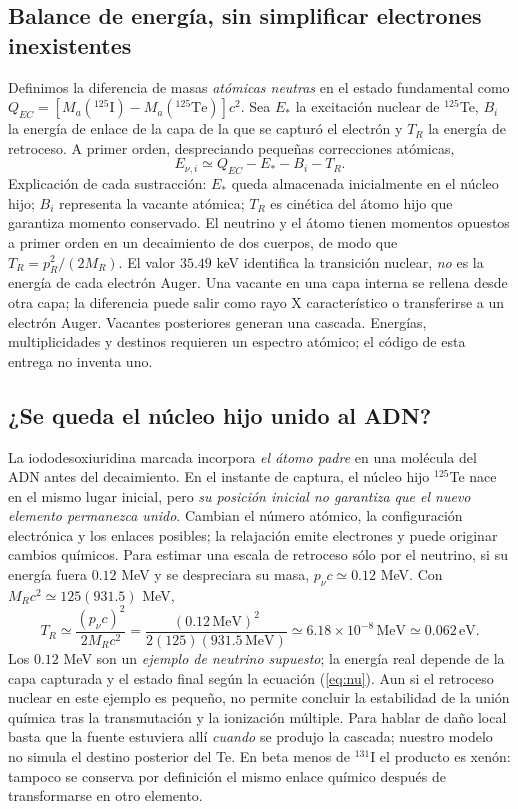 \documentclass[11pt,a4paper]{article}
\newcommand{\I}{\mathrm I}\newcommand{\Te}{\mathrm{Te}}\newcommand{\Xe}{\mathrm{Xe}}
\begin{document}
\subsection{Balance de energía, sin simplificar electrones inexistentes}
Definimos la diferencia de masas \emph{atómicas neutras} en el estado fundamental como $Q_{EC}=[M_a(^{125}\I)-M_a(^{125}\Te)]c^2$. Sea $E_*$ la excitación nuclear de $^{125}$Te, $B_i$ la energía de enlace de la capa de la que se capturó el electrón y $T_R$ la energía de retroceso. A primer orden, despreciando pequeñas correcciones atómicas,
\begin{equation}E_{\nu,i}\simeq Q_{EC}-E_*-B_i-T_R.\label{eq:nu}\end{equation}
Explicación de cada sustracción: $E_*$ queda almacenada inicialmente en el núcleo hijo; $B_i$ representa la vacante atómica; $T_R$ es cinética del átomo hijo que garantiza momento conservado. El neutrino y el átomo tienen momentos opuestos a primer orden en un decaimiento de dos cuerpos, de modo que $T_R=p_R^2/(2M_R)$. El valor $35.49$ keV identifica la transición nuclear, \emph{no} es la energía de cada electrón Auger. Una vacante en una capa interna se rellena desde otra capa; la diferencia puede salir como rayo X característico o transferirse a un electrón Auger. Vacantes posteriores generan una cascada. Energías, multiplicidades y destinos requieren un espectro atómico; el código de esta entrega no inventa uno.

\subsection{¿Se queda el núcleo hijo unido al ADN?}
La iododesoxiuridina marcada incorpora \emph{el átomo padre} en una molécula del ADN antes del decaimiento. En el instante de captura, el núcleo hijo $^{125}$Te nace en el mismo lugar inicial, pero \emph{su posición inicial no garantiza que el nuevo elemento permanezca unido}. Cambian el número atómico, la configuración electrónica y los enlaces posibles; la relajación emite electrones y puede originar cambios químicos. Para estimar una escala de retroceso sólo por el neutrino, si su energía fuera $0.12$ MeV y se despreciara su masa, $p_\nu c\simeq0.12$ MeV. Con $M_Rc^2\simeq125(931.5)$ MeV,
\begin{equation}T_R\simeq\frac{(p_\nu c)^2}{2M_Rc^2}=\frac{(0.12\,\mathrm{MeV})^2}{2(125)(931.5\,\mathrm{MeV})}\simeq6.18\times10^{-8}\,\mathrm{MeV}\simeq0.062\,\mathrm{eV}.\end{equation}
Los $0.12$ MeV son un \emph{ejemplo de neutrino supuesto}; la energía real depende de la capa capturada y el estado final según la ecuación (\ref{eq:nu}). Aun si el retroceso nuclear en este ejemplo es pequeño, no permite concluir la estabilidad de la unión química tras la transmutación y la ionización múltiple. Para hablar de daño local basta que la fuente estuviera allí \emph{cuando} se produjo la cascada; nuestro modelo no simula el destino posterior del Te. En beta menos de $^{131}$I el producto es xenón: tampoco se conserva por definición el mismo enlace químico después de transformarse en otro elemento.
\end{document}
